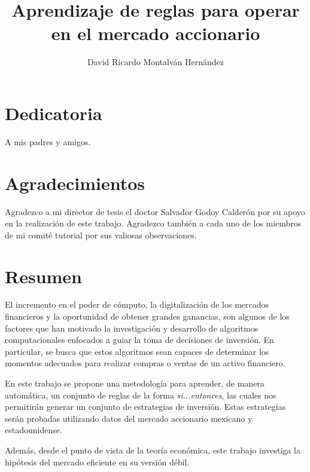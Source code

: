 \documentclass[12pt]{report}
\title{Aprendizaje de reglas para operar en el mercado accionario}
\date{}
\author{David Ricardo Montalván Hernández}
\theoremstyle{break}
\theoremstyle{break}
\begin{document}
\sloppy %

{} %

\chapter*{Dedicatoria}
A mis padres y amigos.

\chapter*{Agradecimientos}
Agradezco a mi director de tesis el doctor Salvador Godoy Calderón por su apoyo en la realización de este trabajo.\newline
Agradezco también a cada uno de los miembros de mi comité tutorial por sus valiosas observaciones.

\renewcommand{\contentsname}{Contenido}
\tableofcontents
\renewcommand{\listfigurename}{Lista de figuras}
\listoffigures
\renewcommand{\listtablename}{Lista de tablas}
\renewcommand\tablename{Tabla}
\renewcommand{\bibname}{Referencias}
\renewcommand{\figurename}{Figura}
\renewcommand{\chaptername}{Capítulo}
\listoftables

\chapter*{Resumen}
El incremento en el poder de cómputo, la digitalización de los mercados financieros y la oportunidad de obtener grandes ganancias, son algunos de los factores que han motivado la investigación y desarrollo de algoritmos computacionales enfocados a guiar la toma de decisiones de inversión. En particular, se busca que estos algoritmos sean capaces de determinar los momentos adecuados para realizar compras o ventas de un activo financiero.

En este trabajo se propone una metodología para aprender, de manera automática, un conjunto de reglas de la forma \textit{si...entonces}, las cuales nos permitirán generar un conjunto de estrategias de inversión. Estas estrategias serán probadas utilizando datos del mercado accionario mexicano y estadounidense.

Además, desde el punto de vista de la teoría económica, este trabajo investiga la hipótesis del mercado eficiente en su versión débil.
\end{document}

